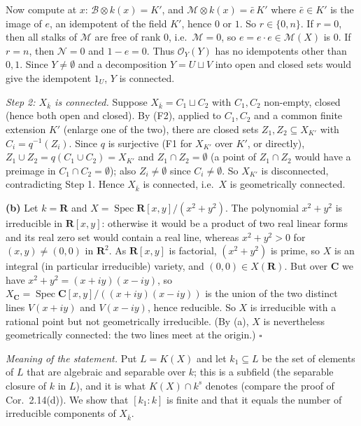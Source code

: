\documentclass[11pt]{article}
\begin{document}
Now compute at $x$: $\mathcal B\otimes k(x)=K'$, and $\mathcal M\otimes k(x)=\bar e\,K'$ where $\bar e\in K'$ is the image of $e$, an idempotent of the field $K'$, hence $0$ or $1$. So $r\in\{0,n\}$. If $r=0$, then all stalks of $\mathcal M$ are free of rank $0$, i.e.\ $\mathcal M=0$, so $e=e\cdot e\in\mathcal M(X)$ is $0$. If $r=n$, then $\mathcal N=0$ and $1-e=0$. Thus $\mathcal O_Y(Y)$ has no idempotents other than $0,1$. Since $Y\neq\emptyset$ and a decomposition $Y=U\sqcup V$ into open and closed sets would give the idempotent $1_U$, $Y$ is connected.

\emph{Step 2: $X_{\overline k}$ is connected.} Suppose $X_{\overline k}=C_1\sqcup C_2$ with $C_1,C_2$ non-empty, closed (hence both open and closed). By (F2), applied to $C_1,C_2$ and a common finite extension $K'$ (enlarge one of the two), there are closed sets $Z_1,Z_2\subseteq X_{K'}$ with $C_i=q^{-1}(Z_i)$. Since $q$ is surjective (F1 for $X_{K'}$ over $K'$, or directly), $Z_1\cup Z_2=q(C_1\cup C_2)=X_{K'}$ and $Z_1\cap Z_2=\emptyset$ (a point of $Z_1\cap Z_2$ would have a preimage in $C_1\cap C_2=\emptyset$); also $Z_i\neq\emptyset$ since $C_i\neq\emptyset$. So $X_{K'}$ is disconnected, contradicting Step 1. Hence $X_{\overline k}$ is connected, i.e.\ $X$ is geometrically connected.

\textbf{(b)} Let $k=\mathbf R$ and $X=\operatorname{Spec}\mathbf R[x,y]/(x^2+y^2)$. The polynomial $x^2+y^2$ is irreducible in $\mathbf R[x,y]$: otherwise it would be a product of two real linear forms and its real zero set would contain a real line, whereas $x^2+y^2>0$ for $(x,y)\neq(0,0)$ in $\mathbf R^2$. As $\mathbf R[x,y]$ is factorial, $(x^2+y^2)$ is prime, so $X$ is an integral (in particular irreducible) variety, and $(0,0)\in X(\mathbf R)$. But over $\mathbf C$ we have $x^2+y^2=(x+iy)(x-iy)$, so $X_{\mathbf C}=\operatorname{Spec}\mathbf C[x,y]/((x+iy)(x-iy))$ is the union of the two distinct lines $V(x+iy)$ and $V(x-iy)$, hence reducible. So $X$ is irreducible with a rational point but not geometrically irreducible. (By (a), $X$ is nevertheless geometrically connected: the two lines meet at the origin.) \hfill$\square$

\pf
\emph{Meaning of the statement.} Put $L=K(X)$ and let $k_1\subseteq L$ be the set of elements of $L$ that are algebraic and separable over $k$; this is a subfield (the separable closure of $k$ in $L$), and it is what $K(X)\cap k^s$ denotes (compare the proof of Cor.~2.14(d)). We show that $[k_1:k]$ is finite and that it equals the number of irreducible components of $X_{\overline k}$.
\end{document}
